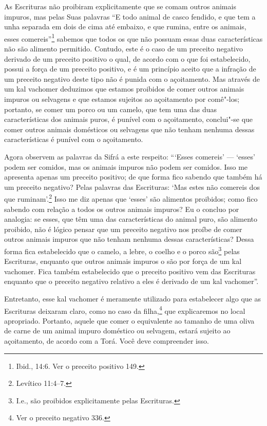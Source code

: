 \begin{multicols}{2}
As Escrituras não proibiram explicitamente que se comam outros animais
impuros, mas pelas Suas palavras ``E todo animal de casco fendido, e que
tem a unha separada em dois de cima até embaixo, e que rumina, entre os
animais, esses comereis''\footnote{Ibid., 14:6. Ver o preceito positivo 149.} sabemos
que todos os que não possuam essas duas características não são alimento
permitido. Contudo, este é o caso de um preceito negativo derivado de um
preceito positivo o qual, de acordo com o que foi estabelecido, possui a
força de um preceito positivo, e é um princípio aceito que a infração de
um preceito negativo deste tipo não é punida com o açoitamento. Mas
através de um kal vachomer\starr{} deduzimos que
estamos proibidos de comer outros animais impuros ou selvagens e que
estamos sujeitos ao açoitamento por comê"-los; portanto, se comer um
porco ou um camelo, que tem uma das duas características dos animais
puros, é punível com o açoitamento, conclui"-se que comer outros animais
domésticos ou selvagens que não tenham nenhuma dessas características é
punível com o açoitamento.

Agora observem as palavras da Sifrá\starr{} a este respeito: ```Esses comereis'
--- `esses' podem ser comidos, mas os animais impuros não podem ser
comidos. Isso me apresenta apenas um preceito positivo; de que forma
fico sabendo que também há um preceito negativo? Pelas palavras das
Escrituras: `Mas estes não comereis dos que ruminam'.\footnote{Levítico 11:4--7.}
Isso me diz apenas que `esses' são alimentos proibidos; como fico
sabendo com relação a todos os outros animais impuros? Eu o concluo por
analogia: se esses, que têm uma das características do animal puro, são
alimento proibido, não é lógico pensar que um preceito negativo nos
proíbe de comer outros animais impuros que não tenham nenhuma dessas
características? Dessa forma fica estabelecido que o camelo, a lebre, o
coelho e o porco são\footnote{I.e., são proibidos explicitamente pelas Escrituras.} pelas Escrituras, enquanto
que outros animais impuros o são por força de um kal vachomer\starr. Fica
também estabelecido que o preceito positivo vem das Escrituras enquanto
que o preceito negativo relativo a eles é derivado de um kal vachomer\starr''.

Entretanto, esse kal vachomer\starr{} é meramente utilizado para estabelecer
algo que as Escrituras deixaram claro, como no caso da
filha,\footnote{Ver o preceito negativo 336.} que explicaremos no local apropriado.
Portanto, aquele que comer o equivalente ao tamanho de uma oliva de
carne de um animal impuro doméstico ou selvagem, estará sujeito ao
açoitamento, de acordo com a Torá\starr. Você deve compreender isso.



\end{multicols}
